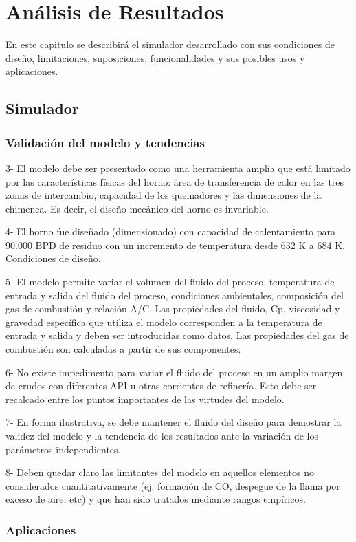 \chapter{Análisis de Resultados}

\par En este capitulo se describirá el simulador desarrollado con sus condiciones de diseño, limitaciones, suposiciones, funcionalidades y sus posibles usos y aplicaciones. 

\section{Simulador}

\subsection{Validación del modelo y tendencias}

3-      El modelo debe ser presentado como una herramienta amplia que está limitado por las características físicas del horno: área de transferencia de calor en las tres zonas de intercambio, capacidad de los quemadores y las dimensiones de la chimenea. Es decir, el diseño mecánico del horno es invariable.

4-      El horno   fue diseñado (dimensionado)  con capacidad de calentamiento para 90.000 BPD de residuo  con un incremento de temperatura desde  632 K a 684 K. Condiciones de diseño.

5-      El modelo permite variar el volumen del fluido del proceso, temperatura de entrada y salida del fluido del proceso, condiciones ambientales, composición del gas de combustión y relación A/C. Las propiedades del fluido, Cp, viscosidad y gravedad específica que utiliza el modelo corresponden a la temperatura de entrada y salida y deben ser introducidas como datos. Las propiedades del gas de combustión son calculadas a partir de sus componentes.

6-      No existe impedimento para variar el fluido del proceso en un amplio margen de crudos con diferentes API u otras corrientes de refinería. Esto debe ser recalcado entre los puntos importantes de las virtudes del modelo.

7-      En forma ilustrativa, se debe mantener el fluido del diseño para demostrar la validez del modelo y  la tendencia de los resultados ante la variación de los parámetros independientes.

8-      Deben quedar claro las limitantes del modelo en aquellos elementos no considerados cuantitativamente (ej. formación de CO, despegue de la llama por exceso de aire, etc) y que han sido tratados mediante rangos empíricos.

\subsection{Aplicaciones}